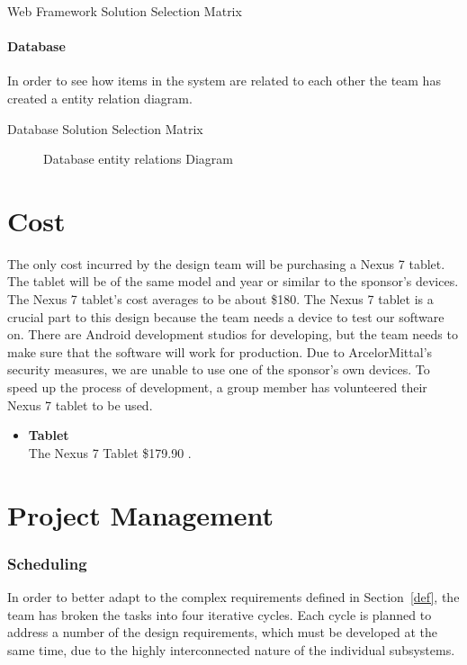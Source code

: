 \documentclass[Letter,11pt]{article}
\begin{document}
		
	
		\begin{table}[h]
			\centering
			
			\caption{\label{WebMatrix} Web Framework Solution Selection Matrix}
		\end{table}
	
	
	\subsection{Database}
		In order to see how items in the system are related to each other the team has created a entity relation diagram.
		\begin{table}[h]
			\centering
			
			\caption{\label{DBMatrix} Database Solution Selection Matrix}
		\end{table}
		
		\begin{figure}[h]
			\centering
			
			\caption{\label{ERdiogram} Database entity relations Diagram}
		\end{figure}
	

		
	
\part{Cost}

The only cost incurred by the design team will be purchasing a Nexus 7 tablet. The tablet will be of the same model and year or similar to the sponsor's devices. The Nexus 7 tablet's cost averages to be about \$180. The Nexus 7 tablet is a crucial part to this design because the team needs a device to test our software on. There are Android development studios for developing, but the team needs to make sure that the software will work for production.  Due to ArcelorMittal's security measures, we are unable to use one of the sponsor's own devices. To speed up the process of development, a group member has volunteered their Nexus 7 tablet to be used. 
	\begin{itemize}
	    \item \textbf{Tablet}\\
		    The Nexus 7 Tablet \$179.90 \cite{nexus7}.\\
		    \end{itemize}
\part{Project Management}
\section{Scheduling}
		In order to better adapt to the complex requirements defined in Section~\ref{def}, the team has broken the tasks into four iterative cycles. Each cycle is planned to address a number of the design requirements, which must be developed at the same time, due to the highly interconnected nature of the individual subsystems. 
\end{document}
